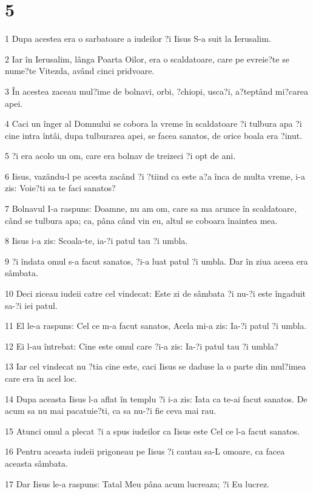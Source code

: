\chapter{5}

\par 1 Dupa acestea era o sarbatoare a iudeilor ?i Iisus S-a suit la Ierusalim.
\par 2 Iar în Ierusalim, lânga Poarta Oilor, era o scaldatoare, care pe evreie?te se nume?te Vitezda, având cinci pridvoare.
\par 3 În acestea zaceau mul?ime de bolnavi, orbi, ?chiopi, usca?i, a?teptând mi?carea apei.
\par 4 Caci un înger al Domnului se cobora la vreme în scaldatoare ?i tulbura apa ?i cine intra întâi, dupa tulburarea apei, se facea sanatos, de orice boala era ?inut.
\par 5 ?i era acolo un om, care era bolnav de treizeci ?i opt de ani.
\par 6 Iisus, vazându-l pe acesta zacând ?i ?tiind ca este a?a înca de multa vreme, i-a zis: Voie?ti sa te faci sanatos?
\par 7 Bolnavul I-a raspuns: Doamne, nu am om, care sa ma arunce în scaldatoare, când se tulbura apa; ca, pâna când vin eu, altul se coboara înaintea mea.
\par 8 Iisus i-a zis: Scoala-te, ia-?i patul tau ?i umbla.
\par 9 ?i îndata omul s-a facut sanatos, ?i-a luat patul ?i umbla. Dar în ziua aceea era sâmbata.
\par 10 Deci ziceau iudeii catre cel vindecat: Este zi de sâmbata ?i nu-?i este îngaduit sa-?i iei patul.
\par 11 El le-a raspuns: Cel ce m-a facut sanatos, Acela mi-a zis: Ia-?i patul ?i umbla.
\par 12 Ei l-au întrebat: Cine este omul care ?i-a zis: Ia-?i patul tau ?i umbla?
\par 13 Iar cel vindecat nu ?tia cine este, caci Iisus se daduse la o parte din mul?imea care era în acel loc.
\par 14 Dupa aceasta Iisus l-a aflat în templu ?i i-a zis: Iata ca te-ai facut sanatos. De acum sa nu mai pacatuie?ti, ca sa nu-?i fie ceva mai rau.
\par 15 Atunci omul a plecat ?i a spus iudeilor ca Iisus este Cel ce l-a facut sanatos.
\par 16 Pentru aceasta iudeii prigoneau pe Iisus ?i cautau sa-L omoare, ca facea aceasta sâmbata.
\par 17 Dar Iisus le-a raspuns: Tatal Meu pâna acum lucreaza; ?i Eu lucrez.

